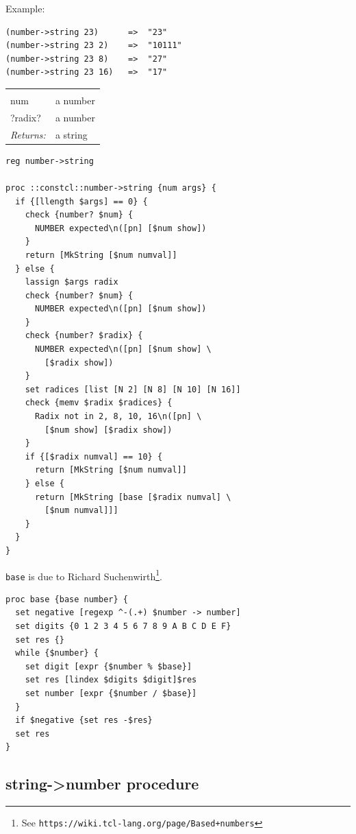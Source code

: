 \documentclass[twoside]{report}
\begin{document}
Example:

\begin{verbatim}
(number->string 23)      =>  "23"
(number->string 23 2)    =>  "10111"
(number->string 23 8)    =>  "27"
(number->string 23 16)   =>  "17"
\end{verbatim}

\noindent\begin{tabular}{ |p{1.9cm} p{8cm}| }
\hline
\rowcolor[HTML]{CCCCCC} \multicolumn{2}{|l|}{\bf number->string (public)} \\
num & a number \\
?radix? & a number \\
\textit{Returns:} & a string \\
\hline
\end{tabular}

\begin{lstlisting}
reg number->string

proc ::constcl::number->string {num args} {
  if {[llength $args] == 0} {
    check {number? $num} {
      NUMBER expected\n([pn] [$num show])
    }
    return [MkString [$num numval]]
  } else {
    lassign $args radix
    check {number? $num} {
      NUMBER expected\n([pn] [$num show])
    }
    check {number? $radix} {
      NUMBER expected\n([pn] [$num show] \
        [$radix show])
    }
    set radices [list [N 2] [N 8] [N 10] [N 16]]
    check {memv $radix $radices} {
      Radix not in 2, 8, 10, 16\n([pn] \
        [$num show] [$radix show])
    }
    if {[$radix numval] == 10} {
      return [MkString [$num numval]]
    } else {
      return [MkString [base [$radix numval] \
        [$num numval]]]
    }
  }
}
\end{lstlisting}

\texttt{base} is due to Richard Suchenwirth\footnote{See \texttt{https://wiki.tcl-lang.org/page/Based+numbers}}.

\begin{lstlisting}
proc base {base number} {
  set negative [regexp ^-(.+) $number -> number]
  set digits {0 1 2 3 4 5 6 7 8 9 A B C D E F}
  set res {}
  while {$number} {
    set digit [expr {$number % $base}]
    set res [lindex $digits $digit]$res
    set number [expr {$number / $base}]
  }
  if $negative {set res -$res}
  set res
}
\end{lstlisting}

\subsection{string->number procedure}
\label{stringnumber-procedure}
\end{document}
